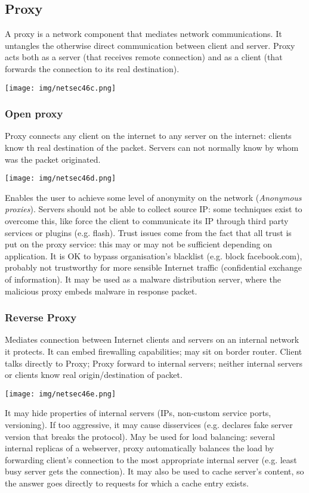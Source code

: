 \documentclass[a4paper, 10pt, titlepage]{article}
\begin{document}
\subsection{Proxy}
A proxy is a network component that mediates network communications. It untangles the otherwise direct communication between client and server. Proxy acts both as a server (that receives remote connection) and as a client (that forwards the connection to its real destination).
\begin{center}
	\texttt{[image: img/netsec46c.png]}
\end{center}

\subsubsection*{Open proxy}
Proxy connects any client on the internet to any server on the internet: clients know th real destination of the packet. Servers can not normally know by whom was the packet originated.
\begin{center}
	\texttt{[image: img/netsec46d.png]}
\end{center}
Enables the user to achieve some level of anonymity on the network (\textit{Anonymous proxies}). Servers should not be able to collect source IP: some techniques exist to overcome this, like force the client to communicate its IP through third party services or plugins (e.g. flash). Trust issues come from the fact that all trust is put on the proxy service: this may or may not be sufficient depending on application. It is OK to bypass organisation’s blacklist (e.g. block facebook.com), probably not trustworthy for more sensible Internet traffic (confidential exchange of information). It may be used as a malware distribution server, where the malicious proxy embeds malware in response packet.

\subsubsection*{Reverse Proxy}
Mediates connection between Internet clients and servers on an internal network it protects. It can embed firewalling capabilities; may sit on border router. Client talks directly to Proxy; Proxy forward to internal servers; neither internal servers or clients know real origin/destination of packet.
\begin{center}
	\texttt{[image: img/netsec46e.png]}
\end{center}
It may hide properties of internal servers (IPs, non-custom service ports, versioning). If too aggressive, it may cause disservices (e.g. declares fake server version that breaks the protocol). May be used for load balancing: several internal replicas of a webserver, proxy automatically balances the load by forwarding client’s connection to the most appropriate internal server (e.g. least busy server gets the connection). It may also be used to cache server’s content, so the answer goes directly to requests for which a cache entry exists.
\end{document}
